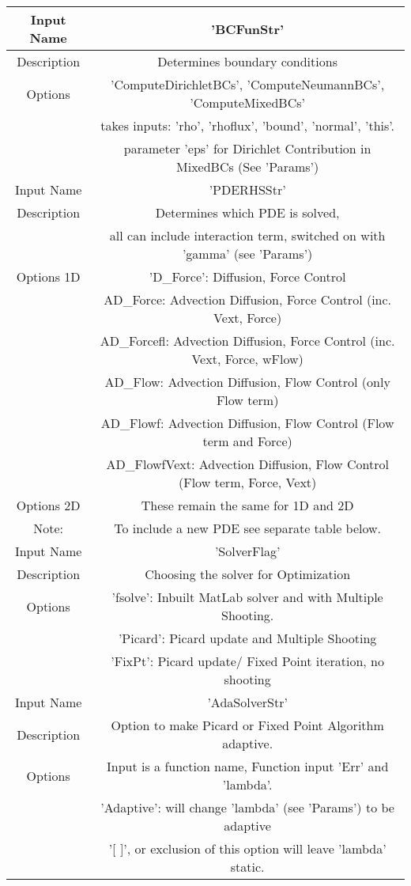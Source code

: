 \documentclass[11pt, a4paper]{article}
\theoremstyle{definition}
\begin{document}
   \begin{center}
	\begin{tabular}{ |c| c | }
		\hline
		Input Name & 'BCFunStr' \\ 
		\hline
		Description & Determines boundary conditions\\ 
		\hline 
		Options & 'ComputeDirichletBCs', 'ComputeNeumannBCs', 'ComputeMixedBCs' \\
		& takes inputs: 'rho', 'rhoflux', 'bound', 'normal', 'this'. \\
		& parameter 'eps' for Dirichlet Contribution in MixedBCs  (See 'Params') \\
		\hline
		\hline
		Input Name & 'PDERHSStr' \\ 
		\hline
		Description & Determines which PDE is solved,\\ 
		& all can include interaction term, switched on with 'gamma' (see 'Params')\\
		\hline 
		Options 1D & 'D\_Force': Diffusion, Force Control \\
		&  AD\_Force: Advection Diffusion, Force Control (inc. Vext, Force) \\
		&  AD\_Forcefl: Advection Diffusion, Force Control (inc. Vext, Force, wFlow) \\
		&  AD\_Flow: Advection Diffusion, Flow Control (only Flow term) \\
		&  AD\_Flowf: Advection Diffusion, Flow Control (Flow term and Force) \\
		&  AD\_FlowfVext: Advection Diffusion, Flow Control (Flow term, Force, Vext) \\
		\hline
		Options 2D & These remain the same for 1D and 2D\\
		\hline
        Note: & To include a new PDE see separate table below.\\
	    	\hline		
			\hline
			Input Name & 'SolverFlag' \\ 
			\hline
			Description & Choosing the solver for Optimization\\ 
			\hline 
			Options & 'fsolve': Inbuilt MatLab solver and with Multiple Shooting. \\
			& 'Picard': Picard update and Multiple Shooting \\
			& 'FixPt': Picard update/ Fixed Point iteration, no shooting \\
			\hline
			\hline
		Input Name & 'AdaSolverStr' \\ 
		\hline
		Description & Option to make Picard or Fixed Point Algorithm adaptive.\\ 
		\hline 
		Options & Input is a function name, Function input 'Err' and 'lambda'.\\
		& 'Adaptive': will change 'lambda' (see 'Params') to be adaptive\\
		& '[  ]', or exclusion of this option will leave 'lambda' static. \\
		\hline
	\end{tabular}
\end{center}
\end{document}
